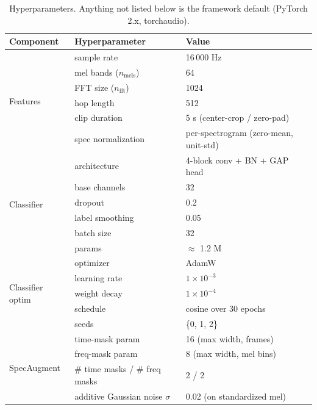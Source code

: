 \documentclass[10pt]{article}
\begin{document}
\begin{table}[!ht]
\centering
\footnotesize
\renewcommand{\arraystretch}{0.95}
\caption{Hyperparameters. Anything not listed below is the framework default (PyTorch 2.x, torchaudio).}\label{tab:hyperparams}
\begin{tabular}{lll}
\toprule
Component & Hyperparameter & Value \\
\midrule
\multirow{6}{*}{Features} & sample rate & 16\,000 Hz \\
                          & mel bands ($n_{\text{mels}}$) & 64 \\
                          & FFT size ($n_{\text{fft}}$) & 1024 \\
                          & hop length & 512 \\
                          & clip duration & 5 s (center-crop / zero-pad) \\
                          & spec normalization & per-spectrogram (zero-mean, unit-std) \\
\midrule
\multirow{6}{*}{Classifier} & architecture & 4-block conv + BN + GAP head \\
                            & base channels & 32 \\
                            & dropout & 0.2 \\
                            & label smoothing & 0.05 \\
                            & batch size & 32 \\
                            & params & $\approx$ 1.2 M \\
\midrule
\multirow{5}{*}{Classifier optim} & optimizer & AdamW \\
                          & learning rate & $1\times10^{-3}$ \\
                          & weight decay & $1\times10^{-4}$ \\
                          & schedule & cosine over 30 epochs \\
                          & seeds & \{0, 1, 2\} \\
\midrule
\multirow{6}{*}{SpecAugment} & time-mask param & 16 (max width, frames) \\
                             & freq-mask param & 8 (max width, mel bins) \\
                             & \# time masks / \# freq masks & 2 / 2 \\
                             & additive Gaussian noise $\sigma$ & 0.02 (on standardized mel) \\

\end{tabular}
\end{table}
\end{document}
